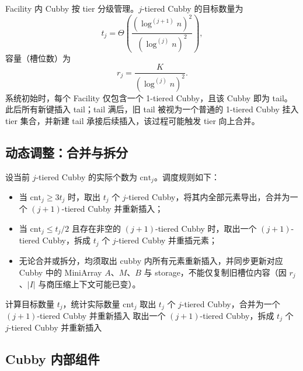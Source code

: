 Facility 内 Cubby 按 tier 分级管理。\(j\)-tiered Cubby 的目标数量为
\[
  t_j=\Theta\!\left(\frac{(\log^{(j+1)}n)^2}{(\log^{(j)}n)^2}\right),
\]
容量（槽位数）为
\[
  r_j=\frac{K}{(\log^{(j)}n)^2}.
\]
系统初始时，每个 Facility 仅包含一个 1-tiered Cubby，且该 Cubby 即为 tail。此后所有新键插入 tail；tail 满后，旧 tail 被视为一个普通的 1-tiered Cubby 挂入 tier 集合，并新建 tail 承接后续插入，该过程可能触发 tier 向上合并\cite{bender2022otsh,bender2024sosa,bender2024iceberg,pandey2023iceberght}。

\subsection{动态调整：合并与拆分}

设当前 \(j\)-tiered Cubby 的实际个数为 \(\mathrm{cnt}_j\)。调度规则如下：
\begin{itemize}
  \item 当 \(\mathrm{cnt}_j\ge 3t_j\) 时，取出 \(t_j\) 个 \(j\)-tiered Cubby，将其内全部元素导出，合并为一个 \((j+1)\)-tiered Cubby 并重新插入；
  \item 当 \(\mathrm{cnt}_j\le t_j/2\) 且存在非空的 \((j+1)\)-tiered Cubby 时，取出一个 \((j+1)\)-tiered Cubby，拆成 \(t_j\) 个 \(j\)-tiered Cubby 并重插元素；
  \item 无论合并或拆分，均须取出 cubby 内所有元素重新插入，并同步更新对应 Cubby 中的 MiniArray \(A\)、\(M\)、\(B\) 与 storage，不能仅复制旧槽位内容（因 \(r_j\)、\(|I|\) 与商压缩上下文可能已变）\cite{bender2022otsh,conway2018,kuszmaul2024filters}。
\end{itemize}

\begin{algorithm}[htbp]
  \caption{Facility tier 数量调度}
  \label{alg:tier-schedule}
  \begin{algorithmic}[1]
      \State 计算目标数量 \(t_j\)，统计实际数量 \(\mathrm{cnt}_j\)
        \State 取出 \(t_j\) 个 \(j\)-tiered Cubby，合并为一个 \((j+1)\)-tiered Cubby 并重新插入
        \State 取出一个 \((j+1)\)-tiered Cubby，拆成 \(t_j\) 个 \(j\)-tiered Cubby 并重新插入
      \EndIf
    \EndFor
  \end{algorithmic}
\end{algorithm}

\subsection{Cubby 内部组件}


